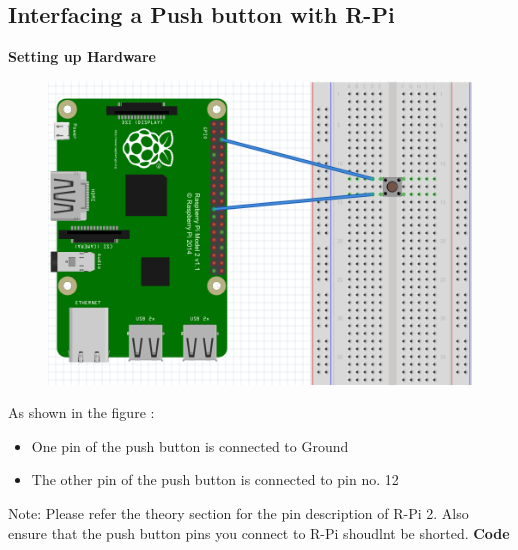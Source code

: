 \documentclass[11pt,a4paper]{article}
\begin{document}
	 \subsection{Interfacing a Push button with R-Pi}
	 \textbf{Setting up Hardware}
	  \begin{figure}[h!]
	  	\includegraphics[scale=0.6]{pb.png}
	  	\centering
	  \end{figure}
	   As shown in the figure :
	   \begin{itemize}
	   	\item One pin of the push button is connected to Ground
	   	\item The other pin of the push button is connected to pin no. 12
	   \end{itemize}
	    Note: Please refer the theory section for the pin description of R-Pi 2. Also ensure that the push button pins you connect to R-Pi shoudlnt be shorted.
	    \vspace{0.3cm}
	    \newline
	    \textbf{Code}
	    
	 
	 \newpage  
\end{document}

